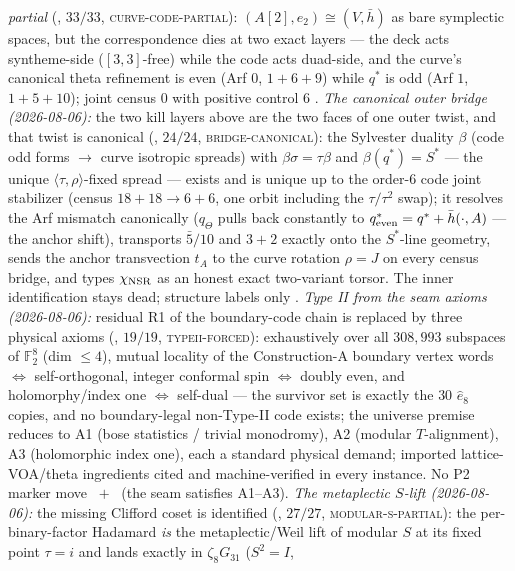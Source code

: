 \documentclass[11pt,a4paper]{article}
\theoremstyle{definition}
\begin{document}
\begin{keybox}
\emph{partial}
(, $33/33$,
\textsc{curve-code-partial}): $(A[2],e_2)\cong(V,\bar h)$ as bare
symplectic spaces, but the correspondence dies at two exact layers
--- the deck acts syntheme-side ($[3,3]$-free) while the code acts
duad-side, and the curve's canonical theta refinement is even
(Arf $0$, $1{+}6{+}9$) while $q^{*}$ is odd (Arf $1$,
$1{+}5{+}10$); joint census $0$ with positive control $6$ \mE.
\emph{The canonical outer bridge (2026-08-06):} the two kill
layers above are the two faces of one outer twist, and that twist
is canonical
(, $24/24$,
\textsc{bridge-canonical}): the Sylvester duality $\beta$ (code odd
forms $\to$ curve isotropic spreads) with
$\beta\sigma=\tau\beta$ and $\beta(q^{*})=S^{*}$ --- the unique
$\langle\tau,\rho\rangle$-fixed spread --- exists and is unique up
to the order-6 code joint stabilizer (census $18+18\to6+6$, one
orbit including the $\tau/\tau^2$ swap); it resolves the Arf
mismatch canonically ($q_{\Theta}$ pulls back constantly to
$q^{*}_{\rm even}=q^{*}+\bar h(\cdot,A)$ --- the anchor shift),
transports $\bar5/10$ and $3{+}2$ exactly onto the $S^{*}$-line
geometry, sends the anchor transvection $t_A$ to the curve
rotation $\rho=J$ on every census bridge, and types
$\chi_{\rm NSR}$ as an honest exact two-variant torsor.  The inner
identification stays dead; structure labels only \mE.
\emph{Type II from the seam axioms (2026-08-06):} residual R1 of
the boundary-code chain is replaced by three physical axioms
(, $19/19$,
\textsc{typeii-forced}): exhaustively over all $308{,}993$
subspaces of $\mathbb F_2^8$ (dim $\le4$), mutual locality of the
Construction-A boundary vertex words $\iff$ self-orthogonal,
integer conformal spin $\iff$ doubly even, and holomorphy/index
one $\iff$ self-dual --- the survivor set is exactly the $30$
$\hat e_8$ copies, and no boundary-legal non-Type-II code exists;
the universe premise reduces to A1 (bose statistics / trivial
monodromy), A2 (modular $T$-alignment), A3 (holomorphic index
one), each a standard physical demand; imported lattice-VOA/theta
ingredients cited and machine-verified in every instance.  No P2
marker move \mE\ $+$ \mC\ (the seam satisfies A1--A3).
\emph{The metaplectic $S$-lift (2026-08-06):} the missing Clifford
coset is identified
(, $27/27$,
\textsc{modular-s-partial}): the per-binary-factor Hadamard
\emph{is} the metaplectic/Weil lift of modular $S$ at its fixed
point $\tau=i$ and lands exactly in $\zeta_8G_{31}$ ($S^2=I$,

\end{keybox}
\end{document}
